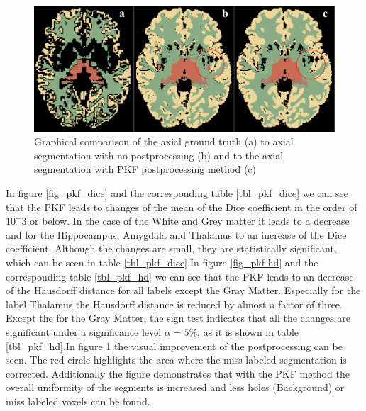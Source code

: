 \documentclass[journal]{IEEEtran}
\begin{document}
\begin{figure}[ht]
\centering
\includegraphics[width=\textwidth]{img/boxplots/PKF.png}
\caption{Graphical comparison of the axial ground truth (a) to axial segmentation with no postprocessing (b) and to the axial segmentation with PKF postprocessing method (c) }
\label{fig_pkf}
\end{figure}

In figure \ref{fig_pkf_dice} and the corresponding table \ref{tbl_pkf_dice} we can see that the PKF leads to changes of the mean of the Dice coefficient in the order of $10^-3$ or below. In the case of the White and Grey matter it leads to a decrease and for the Hippocampus, Amygdala and Thalamus to an increase of the Dice coefficient. Although the changes are small, they are statistically significant, which can be seen in table \ref{tbl_pkf_dice}.In figure \ref{fig_pkf-hd} and the corresponding table \ref{tbl_pkf_hd} we can see that the PKF leads to an decrease of the Hausdorff distance for all labels except the Gray Matter. Especially for the label Thalamus the Hausdorff distance is reduced by almost a factor of three. Except the for the Gray Matter, the sign test indicates that all the changes are significant under a significance level $\alpha = 5\%$, as it is shown in table \ref{tbl_pkf_hd}.In figure \ref{fig_pkf} the visual improvement of the postprocessing can be seen. The red circle highlights the area where the miss labeled segmentation is corrected. Additionally the figure demonstrates that with the PKF method the overall uniformity of the segments is increased and less holes (Background) or miss labeled voxels can be found.
\end{document}
